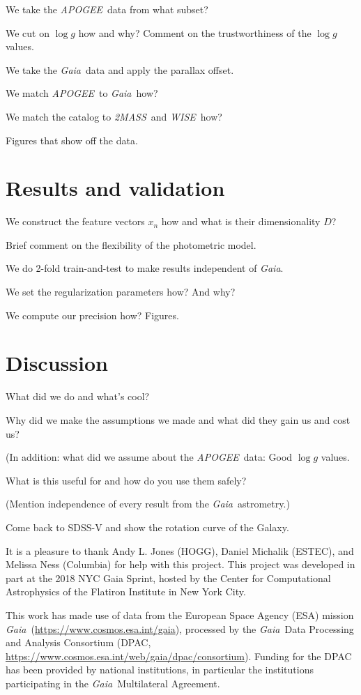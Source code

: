 \documentclass[modern]{aastex62}
\newcommand{\acronym}[1]{{\small{#1}}}
\newcommand{\project}[1]{\textsl{#1}}
\newcommand{\apogee}{\project{\acronym{APOGEE}}}
\newcommand{\gaia}{\project{Gaia}}
\newcommand{\wise}{\project{\acronym{WISE}}}
\newcommand{\zmass}{\project{\acronym{2MASS}}}
\newcommand{\logg}{\log g}
\begin{document}
We take the \apogee\ data from what subset?

We cut on $\logg$ how and why? Comment on the trustworthiness of the $\logg$ values.

We take the \gaia\ data and apply the parallax offset.

We match \apogee\ to \gaia\ how?

We match the catalog to \zmass\ and \wise\ how?

Figures that show off the data.

\section{Results and validation}

We construct the feature vectors $x_n$ how and what is their dimensionality $D$?

Brief comment on the flexibility of the photometric model.

We do 2-fold train-and-test to make results independent of \gaia.

We set the regularization parameters how? And why?

We compute our precision how? Figures.

\section{Discussion}

What did we do and what's cool?

Why did we make the assumptions we made and what did they gain us and cost us?

(In addition: what did we assume about the \apogee\ data: Good $\logg$ values.

What is this useful for and how do you use them safely?

(Mention independence of every result from the \gaia\ astrometry.)

Come back to SDSS-V and show the rotation curve of the Galaxy.

\acknowledgements
It is a pleasure to thank
  Andy L. Jones (HOGG),
  Daniel Michalik (\acronym{ESTEC}), and
  Melissa Ness (Columbia)
for help with this project.
This project was developed in part at the
2018 \acronym{NYC} Gaia Sprint, hosted by the Center for Computational Astrophysics of
the Flatiron Institute in New York City.

This work has made use of data from the European Space Agency (ESA) mission
\gaia\ (\url{https://www.cosmos.esa.int/gaia}), processed by the \gaia\ Data
Processing and Analysis Consortium (\acronym{DPAC},
\url{https://www.cosmos.esa.int/web/gaia/dpac/consortium}). Funding for the
\acronym{DPAC}
has been provided by national institutions, in particular the institutions
participating in the \gaia\ Multilateral Agreement.
\end{document}
